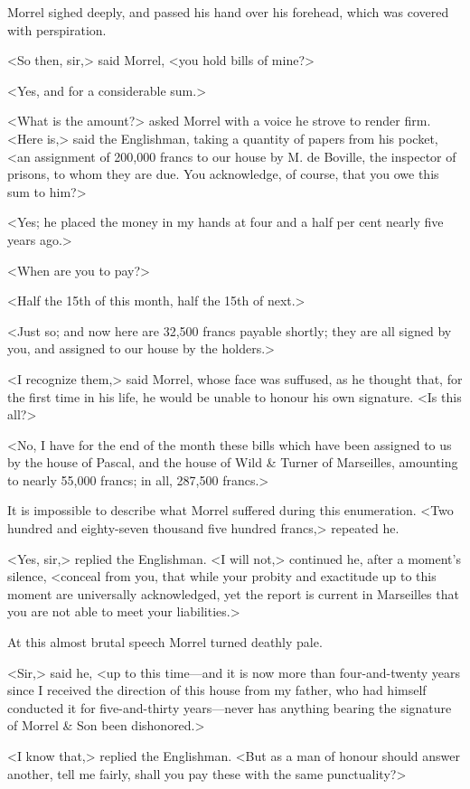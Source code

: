  Morrel sighed deeply, and passed his hand over his forehead, which was covered with perspiration. 

 <So then, sir,> said Morrel, <you hold bills of mine?> 

 <Yes, and for a considerable sum.> 

 <What is the amount?> asked Morrel with a voice he strove to render firm.  <Here is,> said the Englishman, taking a quantity of papers from his pocket, <an assignment of 200,000 francs to our house by M. de Boville, the inspector of prisons, to whom they are due. You acknowledge, of course, that you owe this sum to him?> 

 <Yes; he placed the money in my hands at four and a half per cent nearly five years ago.> 

 <When are you to pay?> 

 <Half the 15th of this month, half the 15th of next.> 

 <Just so; and now here are 32,500 francs payable shortly; they are all signed by you, and assigned to our house by the holders.> 

 <I recognize them,> said Morrel, whose face was suffused, as he thought that, for the first time in his life, he would be unable to honour his own signature. <Is this all?> 

 <No, I have for the end of the month these bills which have been assigned to us by the house of Pascal, and the house of Wild \& Turner of Marseilles, amounting to nearly 55,000 francs; in all, 287,500 francs.> 

 It is impossible to describe what Morrel suffered during this enumeration. <Two hundred and eighty-seven thousand five hundred francs,> repeated he. 

 <Yes, sir,> replied the Englishman. <I will not,> continued he, after a moment's silence, <conceal from you, that while your probity and exactitude up to this moment are universally acknowledged, yet the report is current in Marseilles that you are not able to meet your liabilities.> 

 At this almost brutal speech Morrel turned deathly pale. 

 <Sir,> said he, <up to this time—and it is now more than four-and-twenty years since I received the direction of this house from my father, who had himself conducted it for five-and-thirty years—never has anything bearing the signature of Morrel \& Son been dishonored.> 

 <I know that,> replied the Englishman. <But as a man of honour should answer another, tell me fairly, shall you pay these with the same punctuality?> 

